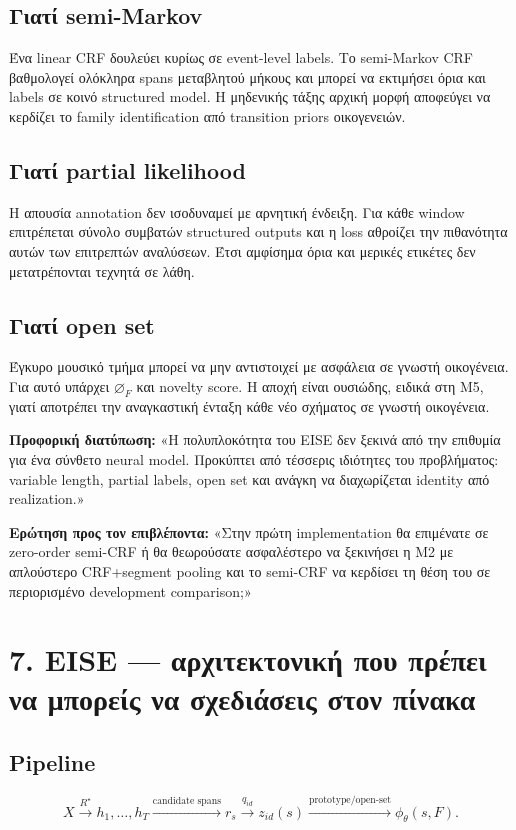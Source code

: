 \documentclass[9pt,a4paper]{extarticle}
\newcommand{\say}[1]{\begin{keybox}\textbf{Προφορική διατύπωση:} #1\end{keybox}}
\newcommand{\ask}[1]{\begin{warnbox}\textbf{Ερώτηση προς τον επιβλέποντα:} #1\end{warnbox}}
\begin{document}
\subsection*{Γιατί semi-Markov}
Ένα linear CRF δουλεύει κυρίως σε event-level labels. Το semi-Markov CRF βαθμολογεί ολόκληρα spans μεταβλητού μήκους και μπορεί να εκτιμήσει όρια και labels σε κοινό structured model. Η μηδενικής τάξης αρχική μορφή αποφεύγει να κερδίζει το family identification από transition priors οικογενειών.

\subsection*{Γιατί partial likelihood}
Η απουσία annotation δεν ισοδυναμεί με αρνητική ένδειξη. Για κάθε window επιτρέπεται σύνολο συμβατών structured outputs και η loss αθροίζει την πιθανότητα αυτών των επιτρεπτών αναλύσεων. Έτσι αμφίσημα όρια και μερικές ετικέτες δεν μετατρέπονται τεχνητά σε λάθη.

\subsection*{Γιατί open set}
Έγκυρο μουσικό τμήμα μπορεί να μην αντιστοιχεί με ασφάλεια σε γνωστή οικογένεια. Για αυτό υπάρχει \(\varnothing_F\) και novelty score. Η αποχή είναι ουσιώδης, ειδικά στη M5, γιατί αποτρέπει την αναγκαστική ένταξη κάθε νέο σχήματος σε γνωστή οικογένεια.

\say{«Η πολυπλοκότητα του EISE δεν ξεκινά από την επιθυμία για ένα σύνθετο neural model. Προκύπτει από τέσσερις ιδιότητες του προβλήματος: variable length, partial labels, open set και ανάγκη να διαχωρίζεται identity από realization.»}

\ask{«Στην πρώτη implementation θα επιμένατε σε zero-order semi-CRF ή θα θεωρούσατε ασφαλέστερο να ξεκινήσει η M2 με απλούστερο CRF+segment pooling και το semi-CRF να κερδίσει τη θέση του σε περιορισμένο development comparison;»}

\newpage
\section*{7. EISE — αρχιτεκτονική που πρέπει να μπορείς να σχεδιάσεις στον πίνακα}

\subsection*{Pipeline}
\[
X\xrightarrow{R^\star} h_1,\ldots,h_T
\xrightarrow{\text{candidate spans}} r_s
\xrightarrow{q_{id}} z_{id}(s)
\xrightarrow{\text{prototype/open-set}} \phi_\theta(s,F).
\]
\end{document}
